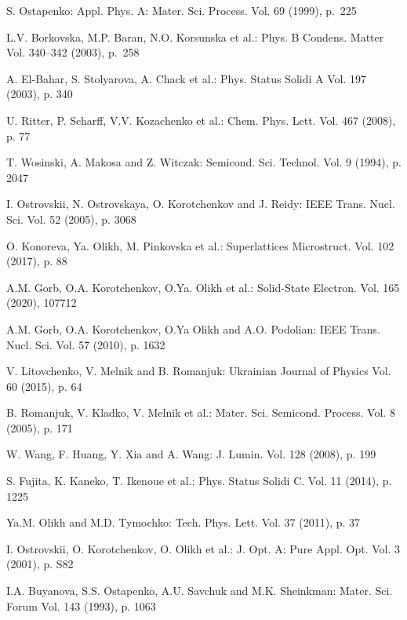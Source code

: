 \documentclass{ttp}
\begin{document}
\begin{thebibliography}{99}

 S. Ostapenko: Appl. Phys. A: Mater. Sci. Process. Vol. 69 (1999), p.~225


 L.V. Borkovska, M.P. Baran, N.O. Korsunska et al.: Phys. B Condens. Matter Vol. 340–342 (2003), p.~258

 A. El-Bahar, S. Stolyarova, A. Chack et al.: Phys. Status Solidi A Vol. 197 (2003), p. 340

 U. Ritter, P. Scharff, V.V. Kozachenko et al.: Chem. Phys. Lett. Vol. 467 (2008), p. 77

 T. Wosinski, A. Makosa and Z. Witczak: Semicond. Sci. Technol. Vol. 9 (1994), p. 2047

 I. Ostrovskii, N. Ostrovskaya, O. Korotchenkov and J. Reidy: IEEE Trans. Nucl. Sci. Vol. 52 (2005), p. 3068

 O. Konoreva, Ya. Olikh, M. Pinkovska et al.: Superlattices Microstruct. Vol. 102 (2017), p. 88

 A.M. Gorb, O.A. Korotchenkov, O.Ya. Olikh et al.: Solid-State Electron. Vol. 165 (2020), 107712

 A.M. Gorb, O.A. Korotchenkov, O.Ya Olikh and A.O. Podolian: IEEE Trans. Nucl. Sci. Vol. 57 (2010), p. 1632

 V. Litovchenko, V. Melnik and B. Romanjuk: Ukrainian Journal of Physics Vol. 60 (2015), p. 64

 B. Romanjuk, V. Kladko, V. Melnik et al.: Mater. Sci. Semicond. Process. Vol. 8 (2005), p. 171

 W. Wang, F. Huang, Y. Xia and A. Wang: J. Lumin. Vol. 128 (2008), p. 199

 S. Fujita, K. Kaneko, T. Ikenoue et al.: Phys. Status Solidi C. Vol. 11 (2014), p. 1225

 Ya.M. Olikh  and  M.D. Tymochko: Tech. Phys. Lett. Vol. 37 (2011), p. 37

 I. Ostrovskii, O. Korotchenkov, O. Olikh et al.: J. Opt. A: Pure Appl. Opt. Vol. 3 (2001), p. S82

 I.A. Buyanova, S.S. Ostapenko, A.U. Savchuk and M.K. Sheinkman: Mater. Sci. Forum Vol. 143 (1993), p. 1063


\end{thebibliography}
\end{document}
